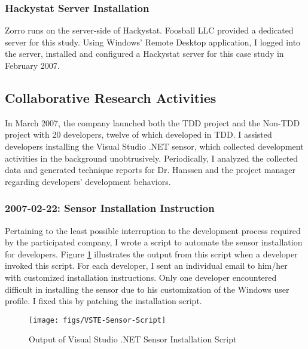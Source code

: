 \subsubsection{Hackystat Server Installation}
Zorro runs on the server-side of Hackystat. Foosball LLC provided a dedicated server for this study. Using Windows' Remote Desktop application, I logged into the server, installed and configured a Hackystat server for this case study in February 2007.

\subsection{Collaborative Research Activities}
In March 2007, the company launched both the TDD project and the Non-TDD project with 20 developers, twelve of which developed in TDD. I assisted developers installing the Visual Studio .NET sensor, which collected development activities in the background unobtrusively. Periodically, I analyzed the collected data and generated technique reports for Dr. Hanssen and the project manager regarding developers' development behaviors.

\subsubsection{2007-02-22: Sensor Installation Instruction}
Pertaining to the least possible interruption to the development process required by the participated company, I wrote a script to automate the sensor installation for developers. Figure \ref{fig:VSTE-Sensor-Script} illustrates the output from this script when a developer invoked this script. For each developer, I sent an individual email to him/her with customized installation instructions. Only one developer encountered difficult in installing the sensor due to his customization of the Windows user profile. I fixed this by patching the installation script. 

\begin{figure}[htbp]
  \centering
  \texttt{[image: figs/VSTE-Sensor-Script]}
  \caption{Output of Visual Studio .NET Sensor Installation Script}
  \label{fig:VSTE-Sensor-Script}
\end{figure}

